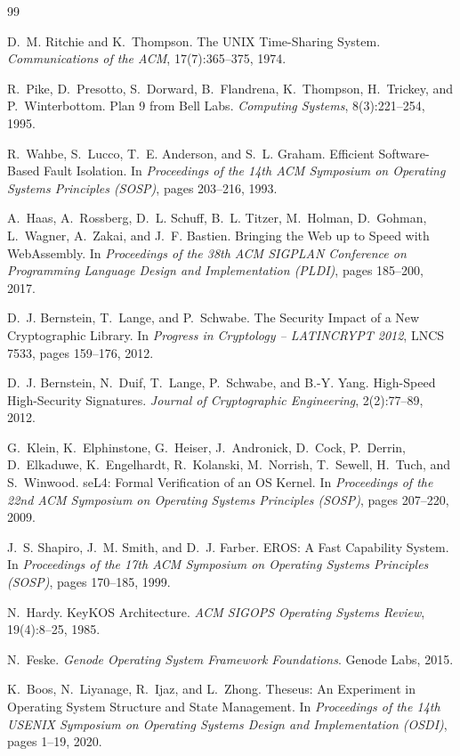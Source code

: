 \documentclass[10pt,twocolumn]{article}
\begin{document}
\begin{thebibliography}{99}

D.~M. Ritchie and K.~Thompson.
The UNIX Time-Sharing System.
\emph{Communications of the ACM}, 17(7):365--375, 1974.

R.~Pike, D.~Presotto, S.~Dorward, B.~Flandrena, K.~Thompson, H.~Trickey, and
P.~Winterbottom.
Plan 9 from Bell Labs.
\emph{Computing Systems}, 8(3):221--254, 1995.

R.~Wahbe, S.~Lucco, T.~E. Anderson, and S.~L. Graham.
Efficient Software-Based Fault Isolation.
In \emph{Proceedings of the 14th ACM Symposium on Operating Systems Principles
(SOSP)}, pages 203--216, 1993.

A.~Haas, A.~Rossberg, D.~L. Schuff, B.~L. Titzer, M.~Holman, D.~Gohman,
L.~Wagner, A.~Zakai, and J.~F. Bastien.
Bringing the Web up to Speed with WebAssembly.
In \emph{Proceedings of the 38th ACM SIGPLAN Conference on Programming Language
Design and Implementation (PLDI)}, pages 185--200, 2017.

D.~J. Bernstein, T.~Lange, and P.~Schwabe.
The Security Impact of a New Cryptographic Library.
In \emph{Progress in Cryptology -- LATINCRYPT 2012}, LNCS 7533, pages 159--176,
2012.

D.~J. Bernstein, N.~Duif, T.~Lange, P.~Schwabe, and B.-Y. Yang.
High-Speed High-Security Signatures.
\emph{Journal of Cryptographic Engineering}, 2(2):77--89, 2012.

G.~Klein, K.~Elphinstone, G.~Heiser, J.~Andronick, D.~Cock, P.~Derrin,
D.~Elkaduwe, K.~Engelhardt, R.~Kolanski, M.~Norrish, T.~Sewell, H.~Tuch, and
S.~Winwood.
seL4: Formal Verification of an OS Kernel.
In \emph{Proceedings of the 22nd ACM Symposium on Operating Systems Principles
(SOSP)}, pages 207--220, 2009.

J.~S. Shapiro, J.~M. Smith, and D.~J. Farber.
EROS: A Fast Capability System.
In \emph{Proceedings of the 17th ACM Symposium on Operating Systems Principles
(SOSP)}, pages 170--185, 1999.

N.~Hardy.
KeyKOS Architecture.
\emph{ACM SIGOPS Operating Systems Review}, 19(4):8--25, 1985.

N.~Feske.
\emph{Genode Operating System Framework Foundations}.
Genode Labs, 2015.

K.~Boos, N.~Liyanage, R.~Ijaz, and L.~Zhong.
Theseus: An Experiment in Operating System Structure and State Management.
In \emph{Proceedings of the 14th USENIX Symposium on Operating Systems Design and
Implementation (OSDI)}, pages 1--19, 2020.


\end{thebibliography}
\end{document}
